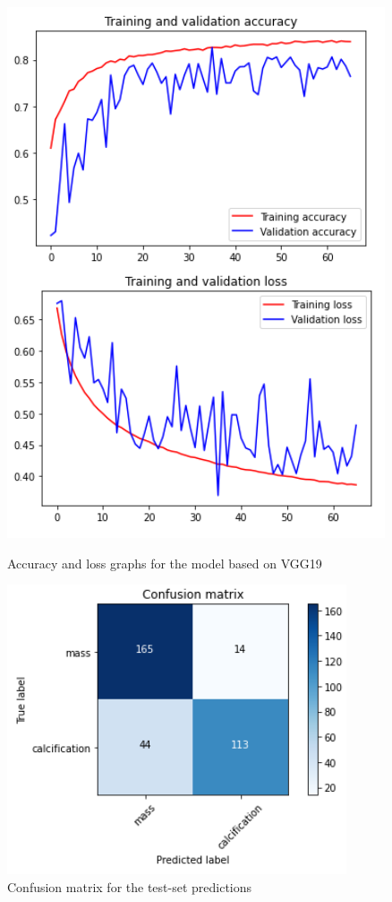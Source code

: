 \documentclass[11pt,a4paper,oneside]{article}
\begin{document}
\begin{figure}[h]
\centering
	\begin{minipage}[c]{.4\textwidth}
		\centering\setlength{\captionmargin}{0pt}%
		\includegraphics[width=.9\textwidth]{images/Task 3/VGG19 3.1/Accuracy}
		\caption{Accuracy and loss graphs for the model based on VGG19}
		\label{fig:vgg19_3.1_accuracy}
	\end{minipage}
	\hspace{5mm}%
	\begin{minipage}[c]{.4\textwidth}
		\centering\setlength{\captionmargin}{0pt}%
		\includegraphics[width=.9\textwidth]{images/Task 3/VGG19 3.1/Conf Matrix}
		\caption{Confusion matrix for the test-set predictions}
		\label{fig:vgg19_3.1_matrix}
	\end{minipage}%
\end{figure}
\end{document}

